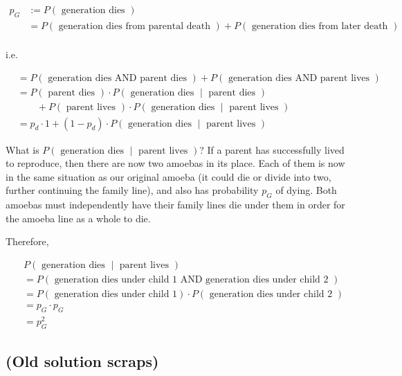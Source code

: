 \begin{align*}
p_G &:= P(\text{ generation dies }) \\
&= P(\text{ generation dies from parental death }) + P(\text{ generation dies from later death }) \\ %
\end{align*}

i.e.

\begin{align*}
&= P(\text{ generation dies AND parent dies }) + P(\text{ generation dies AND parent lives }) \\
&= P(\text{ parent dies }) \cdot P\left(\text{ generation dies } \middle| \text{ parent dies }\right) \\
&\qquad + P(\text{ parent lives }) \cdot P\left(\text{ generation dies } \middle| \text{ parent lives }\right) \\
&= p_d \cdot 1 + (1 - p_d) \cdot P\left(\text{ generation dies } \middle| \text{ parent lives }\right)
\end{align*}

What is $P\left(\text{ generation dies } \middle| \text{ parent lives }\right)$? If a parent has successfully lived to reproduce, then there are now two amoebas in its place. Each of them is now in the same situation as our original amoeba (it could die or divide into two, further continuing the family line), and also has probability $p_G$ of dying. Both amoebas must independently have their family lines die under them in order for the amoeba line as a whole to die.

Therefore, 

\begin{align*}
&P\left(\text{ generation dies } \middle| \text{ parent lives }\right) \\
&= P\left(\text{ generation dies under child 1 AND generation dies under child 2 } \right) \\
&= P\left(\text{ generation dies under child 1} \right) \cdot P\left(\text{ generation dies under child 2 } \right) \\
&= p_G \cdot p_G \\
&= p_G^2
\end{align*}



\subsection{(Old solution scraps)}

